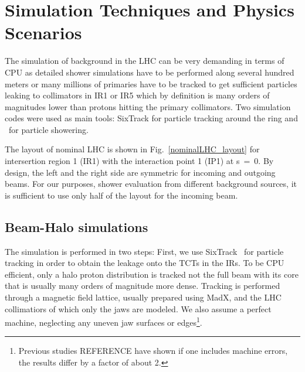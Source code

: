 \section{Simulation Techniques and Physics Scenarios\label{simSetup}}

The simulation of background in the LHC can be very demanding in terms of CPU as detailed shower simulations have to be performed along several hundred meters or many millions of primaries have to be tracked to get sufficient particles leaking to collimators in IR1 or IR5 which by definition is many orders of magnitudes lower than protons hitting the primary collimators. Two simulation codes were used as main tools: SixTrack for particle tracking around the ring and \fluka~for particle showering. 

The layout of nominal LHC is shown in Fig.~\ref{nominalLHC_layout} for intersertion region 1 (IR1) with the interaction point 1 (IP1) at s~=~0. By design, the left and the right side are symmetric for incoming and outgoing beams. For our purposes, shower evaluation from different background sources, it is sufficient to use only half of the layout for the incoming beam. 


\subsection{Beam-Halo simulations}
The simulation is performed in two steps: First, we use SixTrack~\cite{SixTrackRef} for particle tracking in order to obtain the leakage onto the TCTs in the IRs. To be CPU efficient, only a halo proton distribution is tracked not the full beam with its core that is usually many orders of magnitude more dense. Tracking is performed through a magnetic field lattice, usually prepared using MadX, and the LHC collimatiors of which only the jaws are modeled. We also assume a perfect machine, neglecting any uneven jaw surfaces or edges\footnote{Previous studies REFERENCE have shown if one includes machine errors, the results differ by a factor of about 2.}.

